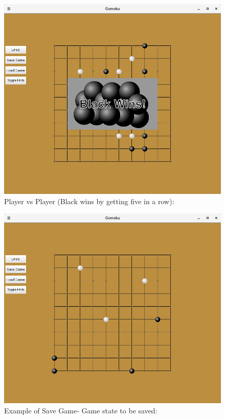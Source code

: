 \documentclass[11]{article}
\begin{document}
\begin{figure}[h]
					\caption{Player vs Player (Black wins by getting five in a row):}				\centering
					\includegraphics[scale=0.5]{pvp3.png}
\end{figure}

\begin{figure}[h]
					\caption{Example of Save Game- Game state to be saved:}				\centering
					\includegraphics[scale=0.5]{save1.png}
\end{figure}
\end{document}
